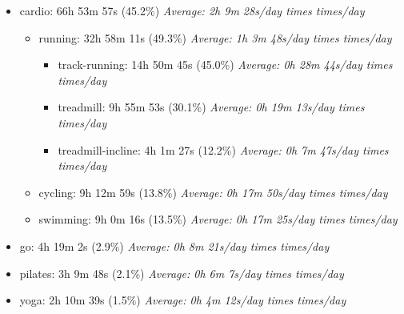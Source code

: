 \documentclass[12pt]{extarticle}
\begin{document}
\begin{itemize}[topsep=0pt, itemsep=-0.5ex]
\begin{itemize}[topsep=0pt, itemsep=-0.5ex]
\begin{itemize}[topsep=0pt, itemsep=-0.5ex]
    \item front-squat: 2h 4m 37s (27.0\%)
        \textit{Average: 0h 4m 1s/day  times  times/day}\par
    \item squat: 0h 12m 34s (2.7\%)
        \textit{Average: 0h 0m 24s/day  times  times/day}\par
\end{itemize}
\end{itemize}
    \item cardio: 66h 53m 57s (45.2\%)
        \textit{Average: 2h 9m 28s/day  times  times/day}\par
\begin{itemize}[topsep=0pt, itemsep=-0.5ex]
    \item running: 32h 58m 11s (49.3\%)
        \textit{Average: 1h 3m 48s/day  times  times/day}\par
\begin{itemize}[topsep=0pt, itemsep=-0.5ex]
    \item track-running: 14h 50m 45s (45.0\%)
        \textit{Average: 0h 28m 44s/day  times  times/day}\par
    \item treadmill: 9h 55m 53s (30.1\%)
        \textit{Average: 0h 19m 13s/day  times  times/day}\par
    \item treadmill-incline: 4h 1m 27s (12.2\%)
        \textit{Average: 0h 7m 47s/day  times  times/day}\par
\end{itemize}
    \item cycling: 9h 12m 59s (13.8\%)
        \textit{Average: 0h 17m 50s/day  times  times/day}\par
    \item swimming: 9h 0m 16s (13.5\%)
        \textit{Average: 0h 17m 25s/day  times  times/day}\par
\end{itemize}
    \item go: 4h 19m 2s (2.9\%)
        \textit{Average: 0h 8m 21s/day  times  times/day}\par
    \item pilates: 3h 9m 48s (2.1\%)
        \textit{Average: 0h 6m 7s/day  times  times/day}\par
    \item yoga: 2h 10m 39s (1.5\%)
        \textit{Average: 0h 4m 12s/day  times  times/day}\par
\end{itemize}
\end{document}
